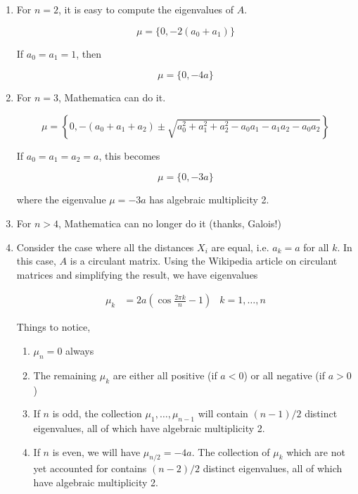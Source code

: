 \documentclass[12pt]{article}
\begin{document}
\begin{enumerate}

\item For $n = 2$, it is easy to compute the eigenvalues of $A$.

\[
\mu = \{ 0, -2(a_0 + a_1) \}
\]

If $a_0 = a_1 = 1$, then

\[
\mu = \{ 0, -4 a \}
\]

\item For $n = 3$, Mathematica can do it.

\[
\mu = \left\{0,  -(a_0 + a_1 + a_2) \pm 
\sqrt{ a_0^2 + a_1^2 + a_2^2 - a_0 a_1 - a_1 a_2 - a_0 a_2 }\right\}
\]

If $a_0 = a_1 = a_2 = a$, this becomes

\[
\mu = \{0,  -3a \}
\]

where the eigenvalue $\mu = -3a$ has algebraic multiplicity 2. 

\item For $n > 4$, Mathematica can no longer do it (thanks, Galois!) 

\item Consider the case where all the distances $X_i$ are equal, i.e. $a_k = a$ for all $k$. In this case, $A$ is a circulant matrix. Using the Wikipedia article on circulant matrices and simplifying the result, we have eigenvalues

\begin{align*}
\mu_k &= 2 a\left( \cos \frac{2 \pi k}{n}  - 1 \right) & k = 1, \dots, n
\end{align*}

Things to notice,

\begin{enumerate}
	\item $\mu_n = 0$ always
	\item The remaining $\mu_k$ are either all positive (if $a < 0$) or all negative (if $a > 0$)
	\item If $n$ is odd, the collection $\mu_1, \dots, \mu_{n-1}$ will contain $(n-1)/2$ distinct eigenvalues, all of which have algebraic multiplicity 2.
	\item If $n$ is even, we will have $\mu_{n/2} = -4a$. The collection of $\mu_k$ which are not yet accounted for contains $(n-2)/2$ distinct eigenvalues, all of which have algebraic multiplicity 2.
\end{enumerate}

\end{enumerate}
\end{document}
